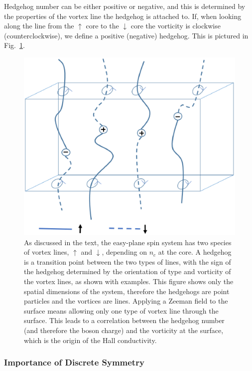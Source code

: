 \documentclass[prb,twocolumn]{revtex4-1}
\begin{document}
Hedgehog number can be either positive or negative, and this is determined by the properties of the vortex line the hedgehog is attached to.
If, when looking along the line from the $\uparrow$ core to the $\downarrow$ core the vorticity is clockwise (counterclockwise), we define a positive (negative) hedgehog.  This is pictured in Fig.~\ref{monopoles}.


\begin{figure}
\includegraphics[width=\linewidth]{figures/monopoles.eps}
\caption{As discussed in the text, the easy-plane spin system has two species of vortex lines, $\uparrow$ and $\downarrow$, depending on $n_c$ at the core. A hedgehog is a transition point between the two types of lines, with the sign of the hedgehog determined by the orientation of type and vorticity of the vortex lines, as shown with examples. This figure shows only the spatial dimensions of the system, therefore the hedgehogs are point particles and the vortices are lines. Applying a Zeeman field to the surface means allowing only one type of vortex line through the surface. This leads to a correlation between the hedgehog number (and therefore the boson charge) and the vorticity at the surface, which is the origin of the Hall conductivity.}
\label{monopoles}
\end{figure}


\subsubsection{Importance of Discrete Symmetry}
\end{document}

